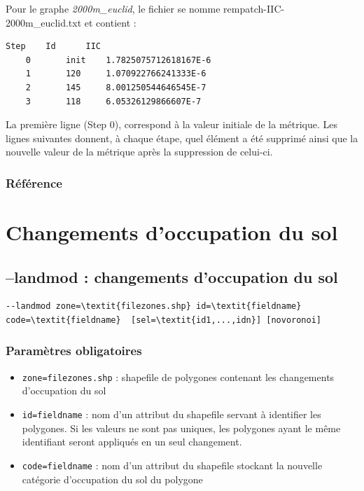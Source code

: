 \documentclass[a4paper,10pt]{report}
\begin{document}
Pour le graphe \textit{2000m\_euclid}, le fichier se nomme rempatch-IIC-2000m\_euclid.txt et contient :
\begin{Verbatim}[tabsize=4]
	Step	Id  	IIC
	0   	init	1.7825075712618167E-6
	1   	120 	1.070922766241333E-6
	2   	145 	8.001250544646545E-7
	3   	118 	6.05326129866607E-7
\end{Verbatim}
La première ligne (Step 0), correspond à la valeur initiale de la métrique. Les lignes suivantes donnent, à chaque étape, quel élément a été supprimé ainsi que la nouvelle valeur de la métrique après la suppression de celui-ci.

\subsubsection{Référence}
\cite{2016_campagnole}


\section{Changements d'occupation du sol}
\subsection{--landmod : changements d'occupation du sol}

\begin{Verbatim}[commandchars=\\\{\}]
--landmod zone=\textit{filezones.shp} id=\textit{fieldname} code=\textit{fieldname}  [sel=\textit{id1,...,idn}] [novoronoi]
\end{Verbatim}

\subsubsection{Paramètres obligatoires}
\begin{itemize}
	\item \verb|zone=filezones.shp| : shapefile de polygones contenant les changements d'occupation du sol
	\item \verb|id=fieldname| : nom d'un attribut du shapefile servant à identifier les polygones. Si les valeurs ne sont pas uniques, les polygones ayant le même identifiant seront appliqués en un seul changement.
	\item \verb|code=fieldname| : nom d'un attribut du shapefile stockant la nouvelle catégorie d'occupation du sol du polygone
\end{itemize}
\end{document}
